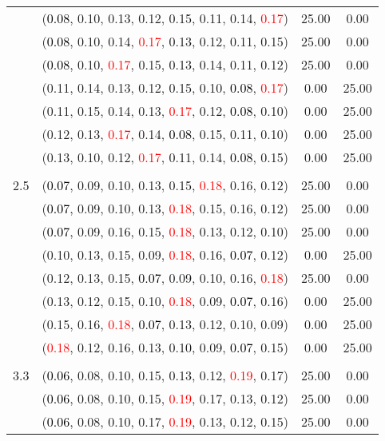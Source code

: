 \documentclass[10pt,a4paper]{report}
\begin{document}
\begin{center}
\begin{longtable}{clcc}
			&(\textcolor{black}{0.08}, 0.10, 0.13, 0.12, 0.15, 0.11, 0.14, \textcolor{red}{0.17})&25.00&0.00\\
			&(\textcolor{black}{0.08}, 0.10, 0.14, \textcolor{red}{0.17}, 0.13, 0.12, 0.11, 0.15)&25.00&0.00\\
			&(\textcolor{black}{0.08}, 0.10, \textcolor{red}{0.17}, 0.15, 0.13, 0.14, 0.11, 0.12)&25.00&0.00\\
			&(0.11, 0.14, 0.13, 0.12, 0.15, 0.10, \textcolor{black}{0.08}, \textcolor{red}{0.17})&0.00&25.00\\
			&(0.11, 0.15, 0.14, 0.13, \textcolor{red}{0.17}, 0.12, \textcolor{black}{0.08}, 0.10)&0.00&25.00\\
			&(0.12, 0.13, \textcolor{red}{0.17}, 0.14, \textcolor{black}{0.08}, 0.15, 0.11, 0.10)&0.00&25.00\\
			&(0.13, 0.10, 0.12, \textcolor{red}{0.17}, 0.11, 0.14, \textcolor{black}{0.08}, 0.15)&0.00&25.00\\
		&&&\\
		2.5			&(\textcolor{black}{0.07}, 0.09, 0.10, 0.13, 0.15, \textcolor{red}{0.18}, 0.16, 0.12)&25.00&0.00\\
			&(\textcolor{black}{0.07}, 0.09, 0.10, 0.13, \textcolor{red}{0.18}, 0.15, 0.16, 0.12)&25.00&0.00\\
			&(\textcolor{black}{0.07}, 0.09, 0.16, 0.15, \textcolor{red}{0.18}, 0.13, 0.12, 0.10)&25.00&0.00\\
			&(0.10, 0.13, 0.15, 0.09, \textcolor{red}{0.18}, 0.16, \textcolor{black}{0.07}, 0.12)&0.00&25.00\\
			&(0.12, 0.13, 0.15, \textcolor{black}{0.07}, 0.09, 0.10, 0.16, \textcolor{red}{0.18})&25.00&0.00\\
			&(0.13, 0.12, 0.15, 0.10, \textcolor{red}{0.18}, 0.09, \textcolor{black}{0.07}, 0.16)&0.00&25.00\\
			&(0.15, 0.16, \textcolor{red}{0.18}, \textcolor{black}{0.07}, 0.13, 0.12, 0.10, 0.09)&0.00&25.00\\
			&(\textcolor{red}{0.18}, 0.12, 0.16, 0.13, 0.10, 0.09, \textcolor{black}{0.07}, 0.15)&0.00&25.00\\
		&&&\\
		3.3			&(\textcolor{black}{0.06}, 0.08, 0.10, 0.15, 0.13, 0.12, \textcolor{red}{0.19}, 0.17)&25.00&0.00\\
			&(\textcolor{black}{0.06}, 0.08, 0.10, 0.15, \textcolor{red}{0.19}, 0.17, 0.13, 0.12)&25.00&0.00\\
			&(\textcolor{black}{0.06}, 0.08, 0.10, 0.17, \textcolor{red}{0.19}, 0.13, 0.12, 0.15)&25.00&0.00\\

\end{longtable}
\end{center}
\end{document}
